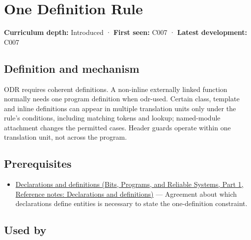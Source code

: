 \hypertarget{appendix-49d27bc9d9a5}{}\label{referencestart:appendix-49d27bc9d9a5}
\section{One Definition Rule}\label{appendix-49d27bc9d9a5-one-definition-rule}

\hypertarget{appendix-49d27bc9d9a5-one-definition-rule}{}

\textbf{Curriculum depth:} Introduced · \textbf{First seen:} C007 · \textbf{Latest development:} C007

\begin{allmightroledefinition}

\subsection{Definition and mechanism}\label{appendix-49d27bc9d9a5-definition-and-mechanism}

\hypertarget{appendix-49d27bc9d9a5-definition-and-mechanism}{}

ODR requires coherent definitions. A non-inline externally linked function normally needs one program definition when odr-used. Certain class, template and inline definitions can appear in multiple translation units only under the rule's conditions, including matching tokens and lookup; named-module attachment changes the permitted cases. Header guards operate within one translation unit, not across the program.

\end{allmightroledefinition}

\subsection{Prerequisites}\label{appendix-49d27bc9d9a5-prerequisites}

\hypertarget{appendix-49d27bc9d9a5-prerequisites}{}

\begin{itemize}
\tightlist
\item
  \href{../01-Bits-Programs-and-Reliable-Systems-P01/main.pdf\#nameddest=appendix-2e4d494c2d94}{Declarations and definitions (Bits, Programs, and Reliable Systems, Part 1, Reference notes: Declarations and definitions)} --- Agreement about which declarations define entities is necessary to state the one-definition constraint.
\end{itemize}

\subsection{Used by}\label{appendix-49d27bc9d9a5-used-by}

